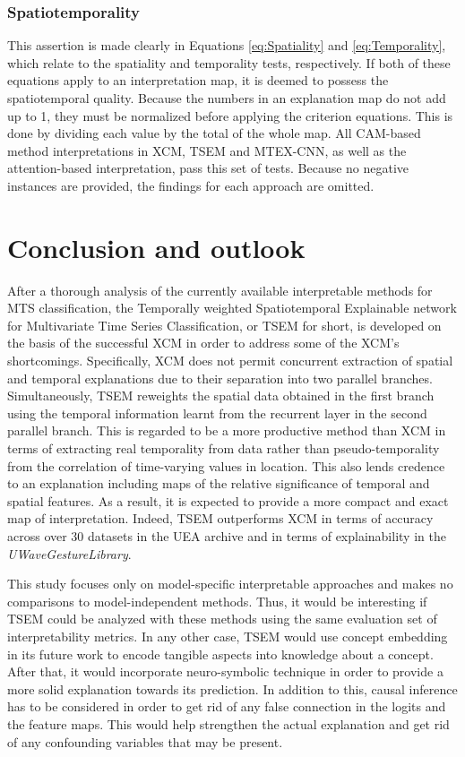\documentclass{svproc}
\begin{document}
\subsubsection{Spatiotemporality}

This assertion is made clearly in Equations \ref{eq:Spatiality} and \ref{eq:Temporality}, which relate to the spatiality and temporality tests, respectively. If both of these equations apply to an interpretation map, it is deemed to possess the spatiotemporal quality. Because the numbers in an explanation map do not add up to 1, they must be normalized before applying the criterion equations. This is done by dividing each value by the total of the whole map. All CAM-based method interpretations in XCM, TSEM and MTEX-CNN, as well as the attention-based interpretation, pass this set of tests. Because no negative instances are provided, the findings for each approach are omitted. 

\section{Conclusion and outlook}

After a thorough analysis of the currently available interpretable methods for MTS classification, the Temporally weighted Spatiotemporal Explainable network for Multivariate Time Series Classification, or TSEM for short, is developed on the basis of the successful XCM in order to address some of the XCM's shortcomings. Specifically, XCM does not permit concurrent extraction of spatial and temporal explanations due to their separation into two parallel branches. Simultaneously, TSEM reweights the spatial data obtained in the first branch using the temporal information learnt from the recurrent layer in the second parallel branch. This is regarded to be a more productive method than XCM in terms of extracting real temporality from data rather than pseudo-temporality from the correlation of time-varying values in location. This also lends credence to an explanation including maps of the relative significance of temporal and spatial features. As a result, it is expected to provide a more compact and exact map of interpretation. Indeed, TSEM outperforms XCM in terms of accuracy across over 30 datasets in the UEA archive and in terms of explainability in the \textit{UWaveGestureLibrary}. 

This study focuses only on model-specific interpretable approaches and makes no comparisons to model-independent methods. Thus, it would be interesting if TSEM could be analyzed with these methods using the same evaluation set of interpretability metrics. In any other case, TSEM would use concept embedding in its future work to encode tangible aspects into knowledge about a concept. After that, it would incorporate neuro-symbolic technique in order to provide a more solid explanation towards its prediction. In addition to this, causal inference has to be considered in order to get rid of any false connection in the logits and the feature maps. This would help strengthen the actual explanation and get rid of any confounding variables that may be present. 



\end{document}
